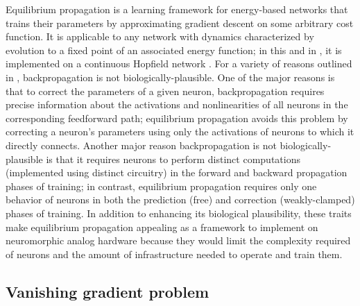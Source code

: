 \documentclass[format=sigconf]{acmart}
\begin{document}
Equilibrium propagation \cite{scellier17} is a learning framework for energy-based networks that trains their parameters by approximating gradient descent on some arbitrary cost function. It is applicable to any network with dynamics characterized by evolution to a fixed point of an associated energy function; in this and in \cite{scellier17}, it is implemented on a continuous Hopfield network \cite{hopfield1984}. For a variety of reasons outlined in \cite{bengio2015}, backpropagation is not biologically-plausible. One of the major reasons is that to correct the parameters of a given neuron, backpropagation requires precise information about the activations and nonlinearities of all neurons in the corresponding feedforward path; equilibrium propagation avoids this problem by correcting a neuron's parameters using only the activations of neurons to which it directly connects. Another major reason backpropagation is not biologically-plausible is that it requires neurons to perform distinct computations (implemented using distinct circuitry) in the forward and backward propagation phases of training; in contrast, equilibrium propagation requires only one behavior of neurons in both the prediction (free) and correction (weakly-clamped) phases of training. In addition to enhancing its biological plausibility, these traits make equilibrium propagation appealing as a framework to implement on neuromorphic analog hardware because they would limit the complexity required of neurons and the amount of infrastructure needed to operate and train them.

\subsection{Vanishing gradient problem}
\label{sec:vangrad}
\end{document}
